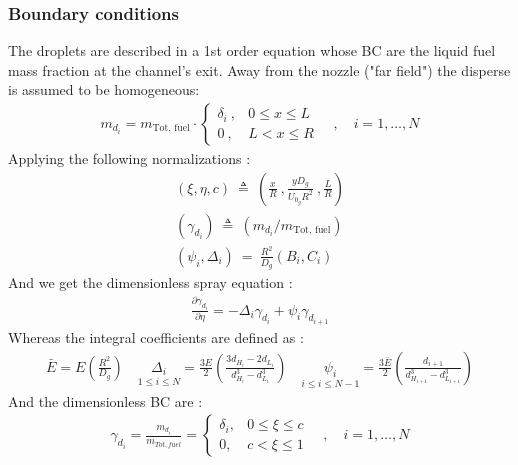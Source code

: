 \documentclass[12pt]{article}
\numberwithin{equation}{section}
\begin{document}
\begin{flushleft}
\newpage

\subsubsection{Boundary conditions}

The droplets are described in a 1st order equation whose BC are the liquid fuel mass
fraction at the channel's exit. Away from the nozzle ("far field") the disperse is assumed to be homogeneous:
\begin{align} 
m_{d_{i}}=m_{\text{Tot, fuel}} \cdot \begin{cases}
\delta_{i} \ , & 0 \leq x \leq L \\
0 \ , & L<x \leq R
\end{cases} \quad , \quad i=1, \ldots, N
\end{align}
Applying the following normalizations :
\begin{align}
(\xi, \eta, c) \ \triangleq \ \left( \frac{x}{R} \ , \frac{y D_{g}}{U_{0_{g}} R^{2}} \ , \frac{L}{R} \right) \label{2_axes_norm} \\
\left(\gamma_{d_{i}}\right) \ \triangleq \ \left(m_{d_{i}} / m_{\text {Tot, fuel}}\right) \\
\left(\psi_{i}, \Delta_{i}\right)\ = \ \frac{R^{2}}{D_{g}}\left(B_{i}, C_{i}\right)
\end{align}
And we get the dimensionless spray equation :
\begin{align} 
\frac{\partial \gamma_{d_{i}}}{\partial \eta}=-\Delta_{i} \gamma_{d_{i}}+\psi_{i} \gamma_{d_{i+1}} \label{2_d_gamma}
\end{align}
Whereas the integral coefficients are defined as :
\begin{align}  
\bar{E}=E\left(\frac{R^{2}}{D_{g}}\right) \quad \underset{1 \leq i \leq N}{\Delta_i}=\frac{3 E}{2}\left(\frac{3 d_{H_{i}}-2 d_{L_{i}}}{d_{H_{i}}^{3}-d_{L_{i}}^{3}}\right) \quad \underset{i \leq i \leq N-1}{\psi_i} =\frac{3 \bar{E}}{2}\left(\frac{d_{i+1}}{d_{H_{i+1}}^{3}-d_{L_{i+1}}^{3}}\right)  \label{2_coeffs}
\end{align}
And the dimensionless BC are :
\begin{align} 
\gamma_{d_{i}}=\frac{m_{d_{i}}}{m_{Tot, fuel}}= \begin{cases}
\delta_{i}, & 0 \leq \xi \leq c \\
0, & c<\xi \leq 1  \end{cases} \quad , \quad  i=1, \ldots, N  \label{2_gamma}
\end{align}


\end{flushleft}
\end{document}
